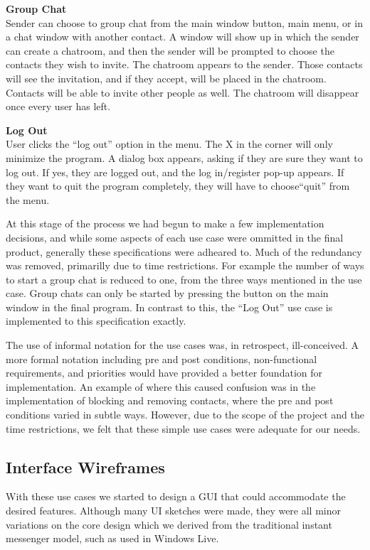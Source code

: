 {\bf Group Chat}\\
Sender can choose to group chat from the main window button, main menu, or in a chat window with another contact. A window will show up in which the sender can create a chatroom, and then the sender will be prompted to choose the contacts they wish to invite. The chatroom appears to the sender. Those contacts will see the invitation, and if they accept, will be placed in the chatroom. Contacts will be able to invite other people as well. The chatroom will disappear once every user has left.

{\bf Log Out}\\
User clicks the ``log out'' option in the menu. The X in the corner will only minimize the program. A dialog box appears, asking if they are sure they want to log out. If yes, they are logged out, and the log in/register pop-up appears. If they want to quit the program completely, they will have to choose``quit'' from the menu.

At this stage of the process we had begun to make a few implementation decisions, and while some aspects of each use case were ommitted in the final product, generally these specifications were adheared to. Much of the redundancy was removed, primarilly due to time restrictions. For example the number of ways to start a group chat is reduced to one, from the three ways mentioned in the use case. Group chats can only be started by pressing the button on the main window in the final program. In contrast to this, the ``Log Out'' use case is implemented to this specification exactly.

The use of informal notation for the use cases was, in retrospect, ill-conceived. A more formal notation including pre and post conditions, non-functional requirements, and priorities would have provided a better foundation for implementation. An example of where this caused confusion was in the implementation of blocking and removing contacts, where the pre and post conditions varied in subtle ways. However, due to the scope of the project and the time restrictions, we felt that these simple use cases were adequate for our needs.

\subsection{Interface Wireframes}

With these use cases we started to design a GUI that could accommodate the desired features. Although many UI sketches were made, they were all minor variations on the core design which we derived from the traditional instant messenger model, such as used in Windows Live.

